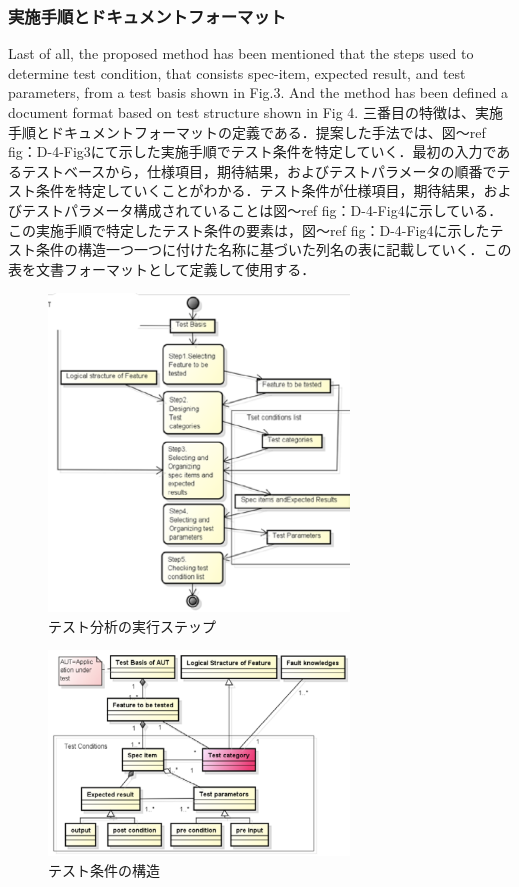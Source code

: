 \documentclass[a4paper,11pt]{jreport}
\begin{document}
\subsubsection{実施手順とドキュメントフォーマット}
Last of all,   the proposed method has been mentioned that the steps used to determine test condition, that consists spec-item, expected result, and test parameters, from a test basis shown in Fig.3. And the method has been defined a document format based on test structure shown in Fig 4.
三番目の特徴は、実施手順とドキュメントフォーマットの定義である．提案した手法では、図〜ref {fig：D-4-Fig3}にて示した実施手順でテスト条件を特定していく．最初の入力であるテストベースから，仕様項目，期待結果，およびテストパラメータの順番でテスト条件を特定していくことがわかる．テスト条件が仕様項目，期待結果，およびテストパラメータ構成されていることは図〜ref {fig：D-4-Fig4}に示している．この実施手順で特定したテスト条件の要素は，図〜ref {fig：D-4-Fig4}に示したテスト条件の構造一つ一つに付けた名称に基づいた列名の表に記載していく．この表を文書フォーマットとして定義して使用する．
\begin{figure}[htbp]
  \begin{center}
  \includegraphics[width=8cm]{./image/D-4-Fig3.png}
  \caption{テスト分析の実行ステップ}
  \label{fig:D-4-Fig3}
  \end{center}
   \end{figure}

\begin{figure}[htbp]
  \begin{center}
  \includegraphics[width=8cm]{./image/D-4-Fig4.png}
  \caption{テスト条件の構造}
  \label{fig:D-4-Fig4}
  \end{center}
   \end{figure}
\end{document}
